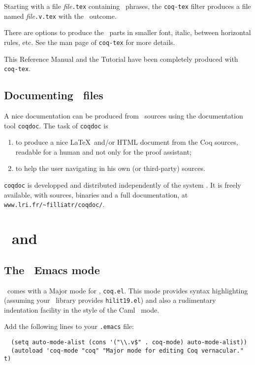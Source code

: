 Starting with a file {\em file}{\tt.tex} containing \Coq\ phrases,
the {\tt coq-tex} filter produces a file named {\em file}{\tt.v.tex} with
the \Coq\ outcome. 

There are options to produce the \Coq\ parts in smaller font, italic,
between horizontal rules, etc.
See the man page of {\tt coq-tex} for more details.

\medskip{} This Reference Manual and the Tutorial
have been completely produced with {\tt coq-tex}.


\subsection{Documenting \Coq\ files}

A nice documentation can be produced from \Coq\ sources using the 
documentation tool \verb!coqdoc!.
The task of \verb!coqdoc! is
\begin{enumerate}
\item to produce a nice \LaTeX\ and/or HTML document from the Coq
  sources, readable for a human and not only for the proof assistant; 
\item to help the user navigating in his own (or third-party) sources. 
\end{enumerate}

\verb!coqdoc! is developped and distributed independently of the
system \Coq. It is freely available, with sources, binaries and a full
documentation, at \verb!www.lri.fr/~filliatr/coqdoc/!.


\section{\Coq\ and \emacs}\label{Emacs}

\subsection{The \Coq\ Emacs mode}

\Coq\ comes with a Major mode for \emacs, {\tt coq.el}. This mode provides
syntax highlighting (assuming your \emacs\ library provides
{\tt hilit19.el}) and also a rudimentary indentation facility
in the style of the Caml \emacs\ mode.

Add the following lines to your \verb!.emacs! file:

\begin{verbatim}
  (setq auto-mode-alist (cons '("\\.v$" . coq-mode) auto-mode-alist))
  (autoload 'coq-mode "coq" "Major mode for editing Coq vernacular." t)
\end{verbatim}

